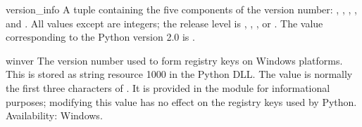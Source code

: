 \begin{datadesc}{version_info}
A tuple containing the five components of the version number:
, , , , and
.  All values except  are integers; the
release level is , ,
, or .  The  value
corresponding to the Python version 2.0 is
.
\end{datadesc}

\begin{datadesc}{winver}
The version number used to form registry keys on Windows platforms.
This is stored as string resource 1000 in the Python DLL.  The value
is normally the first three characters of .  It is
provided in the  module for informational purposes;
modifying this value has no effect on the registry keys used by
Python.
Availability: Windows.
\end{datadesc}
